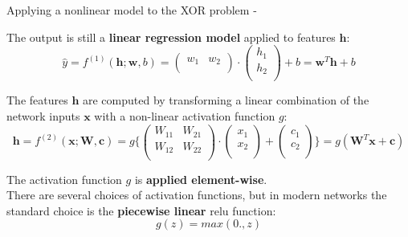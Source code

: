 \begin{frame}[t,allowframebreaks]{Applying a nonlinear model to the XOR problem -}
    \framebreak

    The output is still a {\bf linear regression model} 
    applied to features $\mathbf{h}$:\\
    \begin{equation}
        \hat{y} = 
        f^{(1)}(\mathbf{h};\mathbf{w},b) = 
        \begin{pmatrix}
            w_1 & w_2 \\
        \end{pmatrix} 
        \cdot
        \begin{pmatrix}
            h_1 \\ 
            h_2 \\
        \end{pmatrix} 
        + b =
        \mathbf{w}^{T} \mathbf{h} + b 
        \label{eq:learn_xor_nonlinear_model_out}
    \end{equation}

    The features $\mathbf{h}$ are computed by transforming a linear combination 
    of the network inputs $\mathbf{x}$ with a non-linear activation function $g$:
    \begin{equation}
        \mathbf{h} = 
        f^{(2)}(\mathbf{x};\mathbf{W},\mathbf{c}) = 
        g\Bigg\{
            \begin{pmatrix}
                W_{11} & W_{21} \\
                W_{12} & W_{22} \\
            \end{pmatrix} 
            \cdot
            \begin{pmatrix}
                x_1 \\ 
                x_2 \\
            \end{pmatrix} 
            + 
            \begin{pmatrix}
                c_1 \\ 
                c_2 \\
            \end{pmatrix}
        \Bigg\} =
        g(\mathbf{W}^{T} \mathbf{x} + \mathbf{c})
        \label{eq:learn_xor_nonlinear_model_activation}
    \end{equation}

    The activation function $g$ is {\bf applied element-wise}.\\ 
    \vspace{0.2cm}
    There are several choices of activation functions, 
    but in modern networks the standard choice is the 
    {\bf piecewise linear} \gls{relu} function:
    \begin{equation}
        g(z) = max(0.,z)
        \label{eq:learn_xor_nonlinear_model_activation_relu}
    \end{equation}


\end{frame}
